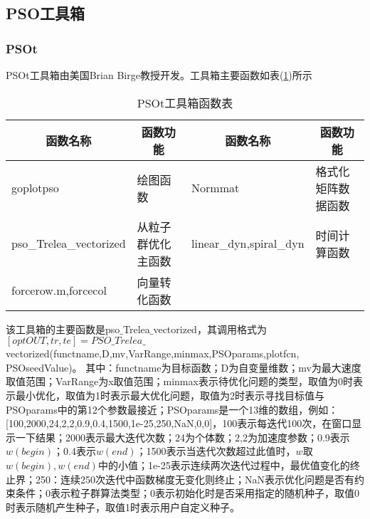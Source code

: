     \subsection{PSO工具箱}
        \subsubsection{PSOt}
            \par
            PSOt工具箱由美国Brian Birge教授开发。工具箱主要函数如表(\ref{tab:PSOt工具箱函数表})所示
        \begin{table}[H]
        \caption{PSOt工具箱函数表}
        \label{tab:PSOt工具箱函数表}
        \begin{tabularx}{\textwidth}{|X|X||X|X|}
        \hline
        \multicolumn{1}{|c}{函数名称} & \multicolumn{1}{|c||}{函数功能} & \multicolumn{1}{c|}{函数名称} & \multicolumn{1}{c|}{函数功能}\\
        \hline
        goplotpso & 绘图函数 & Normmat & 格式化矩阵数据函数\\
        \hline
        pso\_Trelea\_vectorized & 从粒子群优化主函数 & linear\_dyn,spiral\_dyn & 时间计算函数\\
        \hline
        forcerow.m,forcecol & 向量转化函数 & {} & {} \\
        \hline
        \end{tabularx}
        \end{table}
            该工具箱的主要函数是pso$\_$Trelea$\_$vectorized，其调用格式为\\
            $[optOUT,tr,te]=PSO\_Trelea\_$vectorized(functname,D,mv,VarRange,minmax,PSOparams,plotfcn,\\PSOseedValue)。
            其中：functname为目标函数；D为自变量维数；mv为最大速度取值范围；VarRange为x取值范围；minmax表示待优化问题的类型，取值为0时表示最小优化，取值为1时表示最大优化问题，取值为2时表示寻找目标值与PSOparams中的第12个参数最接近；PSOparams是一个13维的数组，例如：[100,2000,24,2,2,0.9,0.4,1500,1e-25,250,NaN,0,0]，100表示每迭代100次，在窗口显示一下结果；2000表示最大迭代次数；24为个体数；2,2为加速度参数；0.9表示$w(begin)$；0.4表示$w(end)$；1500表示当迭代次数超过此值时，$w$取$w(begin),w(end)$中的小值；1e-25表示连续两次迭代过程中，最优值变化的终止界；250：连续250次迭代中函数梯度无变化则终止；NaN表示优化问题是否有约束条件；0表示粒子群算法类型；0表示初始化时是否采用指定的随机种子，取值0时表示随机产生种子，取值1时表示用户自定义种子。
